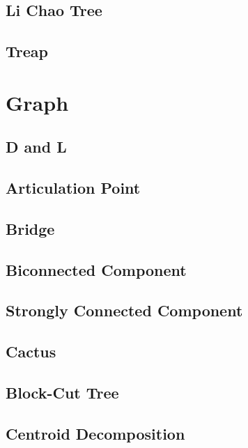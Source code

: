 \documentclass[a4paper,10pt,twocolumn,oneside]{article}
\begin{document}
\subsection{Li Chao Tree}


\subsection{Treap}


\section{Graph}

\subsection{D and L}


\subsection{Articulation Point}


\subsection{Bridge}


\subsection{Biconnected Component}


\subsection{Strongly Connected Component}


\subsection{Cactus}


\subsection{Block-Cut Tree}


\subsection{Centroid Decomposition}

\end{document}
